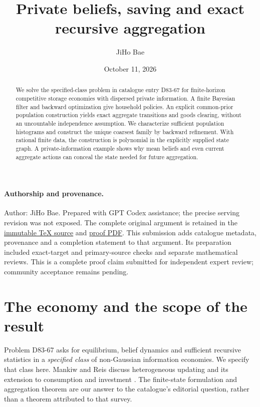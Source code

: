 \documentclass[11pt]{article}
\title{Private beliefs, saving and exact recursive aggregation}
\author{JiHo Bae}
\date{October 11, 2026}
\begin{document}
\maketitle

\paragraph{Authorship and provenance.}
Author: JiHo Bae. Prepared with GPT Codex assistance; the precise serving
revision was not exposed. The complete original argument is retained in
the \href{https://github.com/jbaelaw/private-beliefs-storage-proof/blob/e0a1a66ce965da56b5a15203de2c631e61c20131/paper/Proof.tex}{immutable TeX source} and
\href{https://github.com/jbaelaw/private-beliefs-storage-proof/blob/e0a1a66ce965da56b5a15203de2c631e61c20131/paper/Proof.pdf}{proof PDF}. This submission adds catalogue metadata,
provenance and a completion statement to that argument. Its preparation
included exact-target and primary-source checks and separate mathematical
reviews. This is a complete proof claim submitted for independent expert
review; community acceptance remains pending.

\begin{abstract}
We solve the specified-class problem in catalogue entry D83-67 for finite-horizon competitive storage economies with dispersed private information. A finite Bayesian filter and backward optimization give household policies. An explicit common-prior population construction yields exact aggregate transitions and goods clearing, without an uncountable independence assumption. We characterize sufficient population histograms and construct the unique coarsest family by backward refinement. With rational finite data, the construction is polynomial in the explicitly supplied state graph. A private-information example shows why mean beliefs and even current aggregate actions can conceal the state needed for future aggregation.
\end{abstract}

\section{The economy and the scope of the result}
Problem D83-67 asks for equilibrium, belief dynamics and sufficient recursive statistics in a \emph{specified class} of non-Gaussian information economies. We specify that class here. Mankiw and Reis discuss heterogeneous updating and its extension to consumption and investment \cite[\S\S7.2, 7.4--7.5]{MR}. The finite-state formulation and aggregation theorem are our answer to the catalogue's editorial question, rather than a theorem attributed to that survey.
\end{document}
